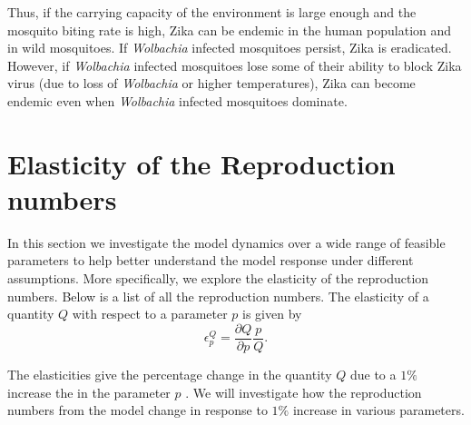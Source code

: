 \documentclass{ws-rv9x6}
\begin{document}


Thus, if the carrying capacity of the environment is large enough and the mosquito biting rate is high, Zika can be endemic in the human population and in wild mosquitoes. If \textit{Wolbachia} infected mosquitoes persist, Zika is eradicated. However, if \textit{Wolbachia} infected mosquitoes lose some of their ability to block Zika virus (due to loss of \textit{Wolbachia} or higher temperatures), Zika can become endemic even when \textit{Wolbachia} infected mosquitoes dominate.

\section{Elasticity of the Reproduction numbers}

In this section we investigate the model dynamics over a wide range of feasible parameters to help better understand the model response under different assumptions.  More specifically, we explore the elasticity of the reproduction numbers. Below is a list of all the reproduction numbers.
The elasticity of a quantity $Q$ with respect to a parameter $p$ is given by
$$\epsilon_p^Q=\dfrac{\partial Q}{\partial p}\dfrac{p}{Q}.$$ 

\noindent The elasticities give the percentage change in the quantity $Q$ due to a $1\%$ increase the in the parameter $p$ \cite{martcheva2015introduction}. We will investigate how the reproduction numbers from the model change in response to $1\%$ increase in various parameters. 
\end{document}
